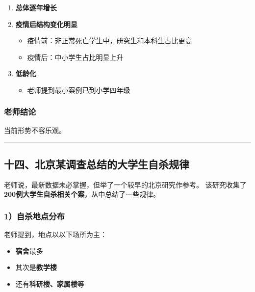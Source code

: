 \documentclass[
  chinese,
  9pt,
  a4paper,
]{ctexart}
\providecommand{\tightlist}{%
  \setlength{\itemsep}{0pt}\setlength{\parskip}{0pt}}
\begin{document}
\begin{enumerate}
\def\labelenumi{\arabic{enumi}.}
\item
  \textbf{总体逐年增长}
\item
  \textbf{疫情后结构变化明显}

  \begin{itemize}
  \tightlist
  \item
    疫情前：非正常死亡学生中，研究生和本科生占比更高
  \item
    疫情后：中小学生占比明显上升
  \end{itemize}
\item
  \textbf{低龄化}

  \begin{itemize}
  \tightlist
  \item
    老师提到最小案例已到小学四年级
  \end{itemize}
\end{enumerate}

\subsubsection{老师结论}\label{ux8001ux5e08ux7ed3ux8bba}

当前形势不容乐观。

\begin{center}\rule{0.5\linewidth}{0.5pt}\end{center}

\subsection{十四、北京某调查总结的大学生自杀规律}\label{ux5341ux56dbux5317ux4eacux67d0ux8c03ux67e5ux603bux7ed3ux7684ux5927ux5b66ux751fux81eaux6740ux89c4ux5f8b}

老师说，最新数据未必掌握，但举了一个较早的北京研究作参考。
该研究收集了\textbf{200例大学生自杀相关个案}，从中总结了一些规律。

\subsubsection{1）自杀地点分布}\label{ux81eaux6740ux5730ux70b9ux5206ux5e03}

老师提到，地点以以下场所为主：

\begin{itemize}
\tightlist
\item
  \textbf{宿舍}最多
\item
  其次是\textbf{教学楼}
\item
  还有\textbf{科研楼、家属楼}等
\end{itemize}
\end{document}
